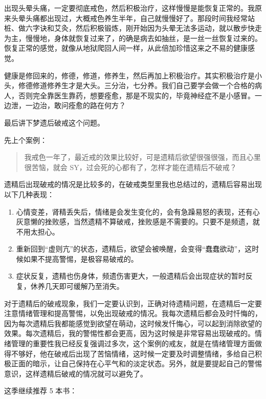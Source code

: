 \documentclass[fontset=founder]{ctexart}
\begin{document}
出现头晕头痛，一定要彻底戒色，然后积极治疗，这样慢慢是能恢复正常的。我原来头晕头痛都出现过，大概戒色养生半年，自己就慢慢好了。那段时间我经常站桩、做六字诀和艾灸，然后积极锻炼，刚开始因为头晕无法多运动，就以散步快走为主，慢慢地，身体就恢复过来了，的确是病去如抽丝，是一丝一丝恢复过来的。恢复正常的感觉，就像从地狱爬回人间一样，从此倍加珍惜这来之不易的健康感觉。

健康是修回来的，修德，修道，修养生，然后再加上积极治疗。其实积极治疗是小头，修德修道修养生才是大头。三分治，七分养。我们自己要学会做一个合格的病人，否则完全靠医生靠药，想要痊愈，那是不现实的，毕竟神经症不是小感冒。一边泄，一边治，敢问痊愈的路在何方？

最后讲下梦遗后破戒这个问题。

先上个案例：

\begin{quote}
    我戒色一年了，最近戒的效果比较好，可是遗精后欲望很强很强，而且心里很苦恼，就会 SY，过会死的心都有了，怎样才能在遗精后不破戒？
\end{quote}

遗精后出现破戒的情况是比较多的，在破戒类型里我也总结过的，遗精后容易出现以下几种表现：

\begin{enumerate}
    \item 心情变差，肾精丢失后，情绪是会发生变化的，会有急躁易怒的表现，还有心灰意懒的挫败感，当然遗精不算破戒，挫败感是不需要的。只要不是频遗，就不用太担心。
    \item 重新回到“虚则亢”的状态，遗精后，欲望会被唤醒，会变得“蠢蠢欲动”，这时候如果不提高警惕，是极容易破戒的。
    \item 症状反复，遗精也伤身体，频遗伤害更大，一般遗精后会出现症状的暂时反复，休养几天即可缓解乃至消失。
\end{enumerate}

对于遗精后的破戒现象，我们一定要认识到，正确对待遗精问题，在遗精后一定要注意情绪管理和提高警惕，以免出现破戒的情况。我每次遗精后都会及时忏悔的，因为每次遗精后我都能感觉到欲望在萌动，这时候发忏悔心，可以起到消除欲望的效果。每次遗精后，我的警惕性都会更高，因为这时候是非常容易出现破戒的。情绪管理的重要性我已经反复强调过多次，这个案例的戒友，就是在情绪管理方面做得不够好，他在破戒后出现了苦恼情绪，这时候一定要及时调整情绪，多给自己积极正面的暗示，让自己保持在心平气和的淡定状态。另外，就是要提起自己的警惕意识，这样遗精后破戒的情况就可以避免了。

这季继续推荐 5 本书：
\end{document}
